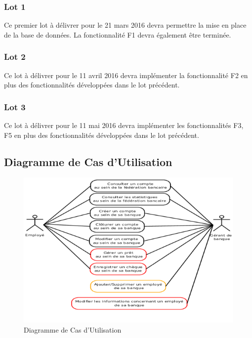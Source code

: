 \subsubsection{Lot 1}

Ce premier lot à délivrer pour le 21 mars 2016 devra permettre la mise en place de la base de données. La fonctionnalité F1 devra également être terminée.

\subsubsection{Lot 2}

Ce lot à délivrer pour le 11 avril 2016 devra implémenter la fonctionnalité F2 en plus des fonctionnalités développées dans le lot précédent.


\subsubsection{Lot 3}

Ce lot à délivrer pour le 11 mai 2016 devra implémenter les fonctionnalités F3{\color{red}{, F4}}, F5 {\color{red}{et F6}} en plus des fonctionnalités développées dans le lot précédent.

\subsection{Diagramme de Cas d'Utilisation}

\begin{figure}[!h]
\begin{center}

   \caption{\label{} Diagramme de Cas d'Utilisation}
   \includegraphics[scale=0.65]{images/CasUtilisation2.png}
   \centering

\end{center}
\end{figure}

